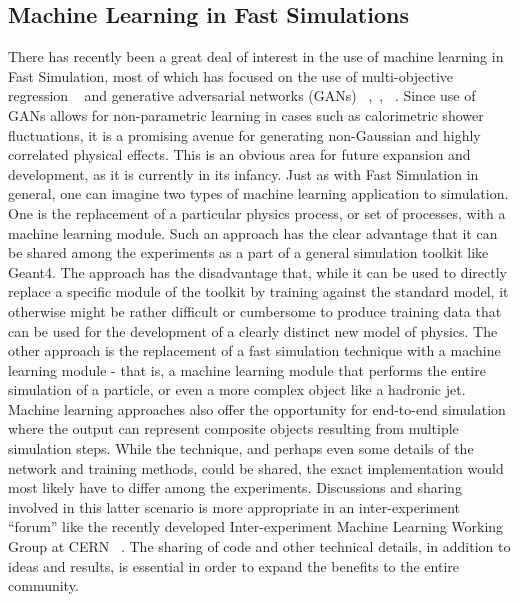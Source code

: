 \documentclass[12pt,a4paper]{article}
\begin{document}
{\hypertarget{machine-learning-in-fast-simulations}{%
\subsection{Machine Learning in Fast
Simulations}\label{machine-learning-in-fast-simulations}}

There has recently been a great deal of interest in the use of machine
learning in Fast Simulation, most of which has focused on the use of
multi-objective regression ~\cite{2007physics...3039H} and generative adversarial networks
(GANs) ~\cite{2014arXiv1406.2661G},~\cite{deOliveira:2017pjk},
~\cite{Paganini:2017hrr}. Since use of GANs allows for non-parametric
learning in cases such as calorimetric shower fluctuations, it is a
promising avenue for generating non-Gaussian and highly correlated
physical effects. This is an obvious area for future expansion and
development, as it is currently in its infancy. Just as with Fast
Simulation in general, one can imagine two types of machine learning
application to simulation. One is the replacement of a particular
physics process, or set of processes, with a machine learning module.
Such an approach has the clear advantage that it can be shared among the
experiments as a part of a general simulation toolkit like Geant4. The
approach has the disadvantage that, while it can be used to directly
replace a specific module of the toolkit by training against the
standard model, it otherwise might be rather difficult or cumbersome to
produce training data that can be used for the development of a clearly
distinct new model of physics. The other approach is the replacement of
a fast simulation technique with a machine learning module - that is, a
machine learning module that performs the entire simulation of a
particle, or even a more complex object like a hadronic jet. Machine
learning approaches also offer the opportunity for end-to-end simulation
where the output can represent composite objects resulting from multiple
simulation steps. While the technique, and perhaps even some details of
the network and training methods, could be shared, the exact
implementation would most likely have to differ among the experiments.
Discussions and sharing involved in this latter scenario is more
appropriate in an inter-experiment ``forum'' like the recently developed
Inter-experiment Machine Learning Working Group at CERN ~\cite{IML}. The
sharing of code and other technical details, in addition to ideas and
results, is essential in order to expand the benefits to the entire
community.

}
\end{document}

